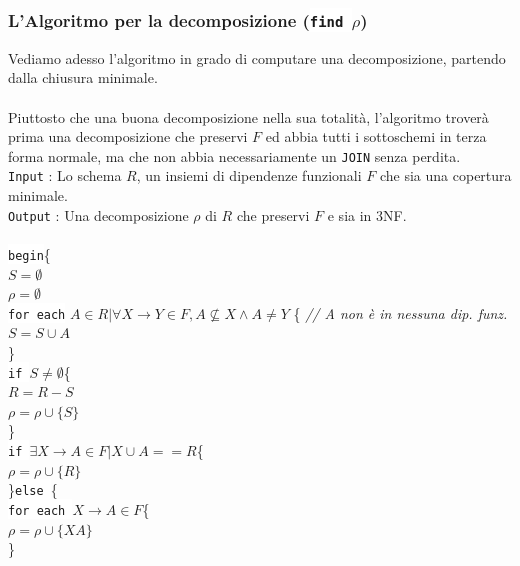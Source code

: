 \documentclass[12pt, letterpaper]{article}
\newcommand{\code}[1]{\colorbox{light-gray}{\texttt{#1}}}
\newcommand{\codee}[1]{\colorbox{white}{\texttt{#1}}}
\newcommand{\acc}{\\\hphantom{}\\}
\begin{document}
\subsubsection{L'Algoritmo per la decomposizione (\codee{find }\(\rho\))}
Vediamo adesso l'algoritmo in  grado di computare una decomposizione, partendo dalla chiusura minimale.\acc 
Piuttosto che una buona decomposizione nella sua totalità, l'algoritmo troverà prima una decomposizione che preservi 
\(F\) ed abbia tutti i sottoschemi in terza forma normale, ma che non abbia necessariamente un \codee{JOIN} senza perdita.\\
\code{Input} : Lo schema \(R\), un insiemi di dipendenze funzionali \(F\) che sia una copertura minimale.\\
\code{Output} : Una decomposizione \(\rho\) di \(R\) che preservi \(F\) e sia in 3NF.\acc
\hphantom{ident}\codee{begin}\{\\
\hphantom{ident}\hphantom{ident}\(S=\emptyset\)\\
\hphantom{ident}\hphantom{ident}\(\rho=\emptyset\)\\ 
\hphantom{ident}\hphantom{ident}\codee{for each}  \(A\in R| \forall X\rightarrow Y\in F, A\nsubseteq X\land A\ne Y\) \{
\color{lg}\textit{// A non è in nessuna dip. funz.}\color{black} \\
\hphantom{ident}\hphantom{ident}\hphantom{ident}\(S=S\cup A\)\\
\hphantom{ident}\hphantom{ident}\}\\
\hphantom{ident}\hphantom{ident}\codee{if }\(S\ne \emptyset\)\{\\
\hphantom{ident}\hphantom{ident}\hphantom{ident} \(R=R-S\)\\
\hphantom{ident}\hphantom{ident}\hphantom{ident} \(\rho=\rho\cup\{S\}\)\\
\hphantom{ident}\hphantom{ident}\}\\
\hphantom{ident}\hphantom{ident}\codee{if }\(\exists X\rightarrow A\in F|X\cup A==R\)\{\\
\hphantom{ident}\hphantom{ident}\hphantom{ident} \(\rho=\rho\cup\{R\}\)\\
\hphantom{ident}\hphantom{ident}\}\codee{else }\{\\
\hphantom{ident}\hphantom{ident}\hphantom{ident}\codee{for each }\(X\rightarrow A\in F\)\{\\
\hphantom{ident}\hphantom{ident}\hphantom{ident}\hphantom{ident}\(\rho=\rho\cup\{XA\}\)\\
\hphantom{ident}\hphantom{ident}\hphantom{ident}\}\\
\end{document}

